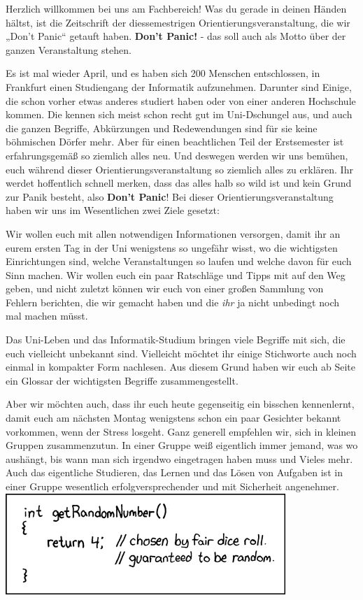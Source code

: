 \spaltenanfang
Herzlich willkommen bei uns am Fachbereich! Was du gerade in deinen Händen
hältst, ist die Zeitschrift der diessemestrigen Orientierungsveranstaltung, die
wir „Don’t Panic“ getauft haben. \textbf{Don’t Panic!} - das soll auch als
Motto über der ganzen Veranstaltung stehen.


Es ist mal wieder April, und es haben sich 200 Menschen entschlossen,
in Frankfurt einen Studiengang der Informatik aufzunehmen. Darunter sind
Einige, die schon vorher etwas anderes studiert haben oder von einer anderen
Hochschule kommen. Die kennen sich meist schon recht gut im Uni-Dschungel aus,
und auch die ganzen Begriffe, Abkürzungen und Redewendungen sind für sie keine
böhmischen Dörfer mehr. Aber für einen beachtlichen Teil der Erstsemester ist
erfahrungsgemäß so ziemlich alles neu. Und deswegen werden wir uns bemühen,
euch während dieser Orientierungsveranstaltung so ziemlich alles zu erklären.
Ihr werdet hoffentlich schnell merken, dass das alles halb so wild ist und kein
Grund zur Panik besteht, also \textbf{Don’t Panic}! Bei dieser
Orientierungsveranstaltung haben wir uns im Wesentlichen zwei Ziele gesetzt:


Wir wollen euch mit allen notwendigen Informationen versorgen, damit ihr an
eurem ersten Tag in der Uni wenigstens so ungefähr wisst, wo die wichtigsten
Einrichtungen sind, welche Veranstaltungen so laufen und welche davon für euch
Sinn machen. Wir wollen euch ein paar Ratschläge und Tipps mit auf den Weg
geben, und nicht zuletzt können wir euch von einer großen Sammlung von Fehlern
berichten, die wir gemacht haben und die \textsl{ihr} ja nicht unbedingt noch
mal machen müsst.


Das Uni-Leben und das Informatik-Studium bringen viele Begriffe mit sich, die
euch vielleicht unbekannt sind. Vielleicht möchtet ihr einige Stichworte auch
noch einmal in kompakter Form nachlesen. Aus diesem Grund haben wir euch ab
Seite \pageref{glossar} ein Glossar der wichtigsten Begriffe zusammengestellt.


Aber wir möchten auch, dass ihr euch heute gegenseitig ein
bisschen kennenlernt, damit euch am nächsten Montag wenigstens schon ein paar
Gesichter bekannt vorkommen, wenn der Stress losgeht. Ganz generell empfehlen
wir, sich in kleinen Gruppen zusammenzutun. In einer Gruppe weiß eigentlich
immer jemand, was wo aushängt, bis wann man sich irgendwo eingetragen haben
muss und Vieles mehr. Auch das eigentliche Studieren, das Lernen und das Lösen
von Aufgaben ist in einer Gruppe wesentlich erfolgversprechender und mit
Sicherheit angenehmer.\\
\spaltenende
\includegraphics{comics/random_number}
